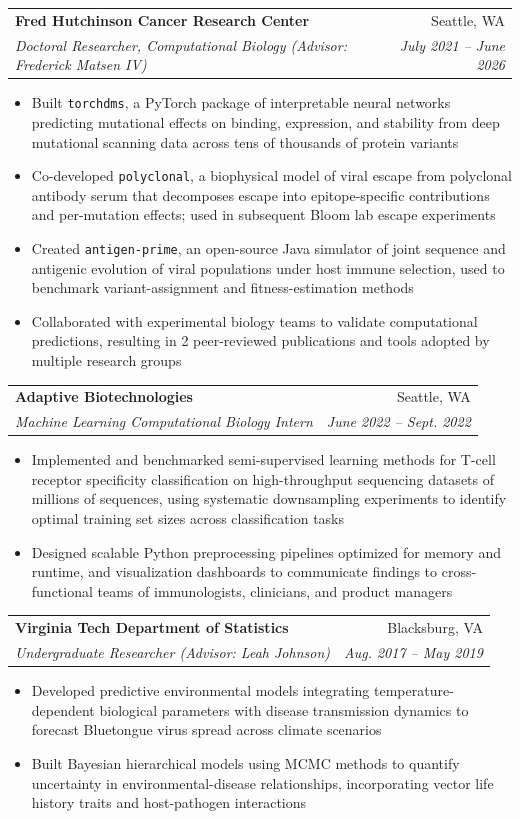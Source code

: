 \documentclass[letterpaper,11pt]{article}
\makeatletter
\newcommand{\resumeItem}[1]{
  \item\small{
    {#1 \vspace{-2pt}}
  }
}
\newcommand{\resumeSubheading}[4]{
  \vspace{-2pt}\item
    \begin{tabular*}{0.97\textwidth}[t]{l@{\extracolsep{\fill}}r}
      \textbf{#1} & #2 \\
      \textit{\small#3} & \textit{\small #4} \\
    \end{tabular*}\vspace{-7pt}
}
\newcommand{\resumeItemListStart}{\begin{itemize}}
\newcommand{\resumeItemListEnd}{\end{itemize}\vspace{-5pt}}
\makeatother
\begin{document}
    \resumeSubheading
      {Fred Hutchinson Cancer Research Center}{Seattle, WA}
      {Doctoral Researcher, Computational Biology (Advisor: Frederick Matsen IV)}{July 2021 -- June 2026}
      \resumeItemListStart
        \resumeItem{Built \texttt{torchdms}, a PyTorch package of interpretable neural networks predicting mutational effects on binding, expression, and stability from deep mutational scanning data across tens of thousands of protein variants}
        \resumeItem{Co-developed \texttt{polyclonal}, a biophysical model of viral escape from polyclonal antibody serum that decomposes escape into epitope-specific contributions and per-mutation effects; used in subsequent Bloom lab escape experiments}
        \resumeItem{Created \texttt{antigen-prime}, an open-source Java simulator of joint sequence and antigenic evolution of viral populations under host immune selection, used to benchmark variant-assignment and fitness-estimation methods}
        \resumeItem{Collaborated with experimental biology teams to validate computational predictions, resulting in 2 peer-reviewed publications and tools adopted by multiple research groups}
      \resumeItemListEnd
      
    \resumeSubheading
      {Adaptive Biotechnologies}{Seattle, WA}
      {Machine Learning Computational Biology Intern}{June 2022 -- Sept. 2022}
      \resumeItemListStart
        \resumeItem{Implemented and benchmarked semi-supervised learning methods for T-cell receptor specificity classification on high-throughput sequencing datasets of millions of sequences, using systematic downsampling experiments to identify optimal training set sizes across classification tasks}
        \resumeItem{Designed scalable Python preprocessing pipelines optimized for memory and runtime, and visualization dashboards to communicate findings to cross-functional teams of immunologists, clinicians, and product managers}
    \resumeItemListEnd

    \resumeSubheading
      {Virginia Tech Department of Statistics}{Blacksburg, VA}
      {Undergraduate Researcher (Advisor: Leah Johnson)}{Aug. 2017 -- May 2019}
      \resumeItemListStart
        \resumeItem{Developed predictive environmental models integrating temperature-dependent biological parameters with disease transmission dynamics to forecast Bluetongue virus spread across climate scenarios}
        \resumeItem{Built Bayesian hierarchical models using MCMC methods to quantify uncertainty in environmental-disease relationships, incorporating vector life history traits and host-pathogen interactions}
      \resumeItemListEnd
\end{document}

